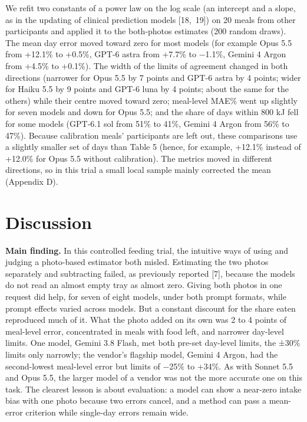 \documentclass[
  11pt,
  letterpaper]{article}
\begin{document}
We refit two constants of a power law on the log scale (an intercept and a slope, as in the updating of
clinical prediction models {[}18,~19{]}) on 20 meals from other participants and applied it to the both-photos
estimates (200 random draws). The mean day error moved toward zero for most models (for example Opus 5.5 from
+12.1\% to +0.5\%, GPT-6 astra from +7.7\% to −1.1\%, Gemini 4 Argon from +4.5\% to +0.1\%). The width of the
limits of agreement changed in both directions (narrower for Opus 5.5 by 7 points and GPT-6 astra by 4 points;
wider for Haiku 5.5 by 9 points and GPT-6 luna by 4 points; about the same for the others) while their centre
moved toward zero; meal-level MAE\% went up slightly for seven models and down for Opus 5.5; and the share of
days within 800 kJ fell for some models (GPT-6.1 sol from 51\% to 41\%, Gemini 4 Argon from 56\% to 47\%).
Because calibration meals' participants are left out, these comparisons use a slightly smaller set of days
than Table 5 (hence, for example, +12.1\% instead of +12.0\% for Opus 5.5 without calibration). The metrics
moved in different directions, so in this trial a small local sample mainly corrected the mean (Appendix D).

\section{Discussion}\label{discussion}

\textbf{Main finding.} In this controlled feeding trial, the intuitive ways of using and judging a photo-based
estimator both misled. Estimating the two photos separately and subtracting failed, as previously reported
{[}7{]}, because the models do not read an almost empty tray as almost zero. Giving both photos in one request
did help, for seven of eight models, under both prompt formats, while prompt effects varied across models. But
a constant discount for the share eaten reproduced much of it. What the photo added on its own was 2 to 4
points of meal-level error, concentrated in meals with food left, and narrower day-level limits. One model,
Gemini 3.8 Flash, met both pre-set day-level limits, the ±30\% limits only narrowly; the vendor's flagship
model, Gemini 4 Argon, had the second-lowest meal-level error but limits of −25\% to +34\%. As with Sonnet 5.5
and Opus 5.5, the larger model of a vendor was not the more accurate one on this task. The clearest lesson is
about evaluation: a model can show a near-zero intake bias with one photo because two errors cancel, and a
method can pass a mean-error criterion while single-day errors remain wide.
\end{document}
